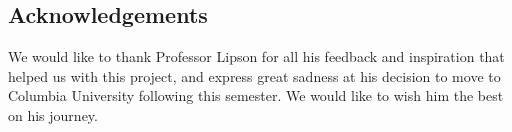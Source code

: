 \documentclass{pnastwo}
\begin{document}
\begin{article}
\section{Acknowledgements}
We would like to thank Professor Lipson for all his feedback and inspiration that helped us with this project, and express great sadness at his decision to move to Columbia University following this semester. We would like to wish him the best on his journey.




%





\end{article}
\end{document}
